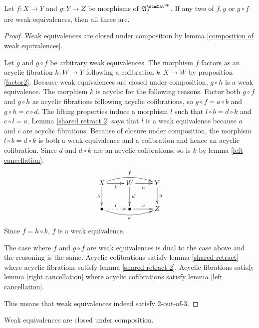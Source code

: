 \documentclass{tac}
\newcommand\dual{^{\mathrm{op}}}
\newcommand\s{^{\simCat\dual}}
\newcommand\of{:}
\newcommand\f{_f}
\newcommand\ambient{\mathfrak A}
\begin{document}
\begin{lemma}[2-out-of-3] Let $f\of X\to Y$ and $g\of Y\to Z$ be morphisms of $\ambient\s\f$. If any two of $f,g$ or $g\circ f$ are weak equivalences, then all three are. \label{toot}\end{lemma}

\begin{proof} Weak equivalences are closed under composition by lemma \ref{composition of weak equivalences}.

Let $g$ and $g\circ f$ be arbitrary weak equivalences. The morphism $f$ factors as an acyclic fibration $h\of W\to Y$ following a cofibration $k\of X\to W$ by proposition \ref{factor2}. Because weak equivalences are closed under composition, $g\circ h$ is a weak equivalence. The morphism $k$ is acyclic for the following reasons. Factor both $g\circ f$ and $g\circ h$ as acyclic fibrations following acyclic cofibrations, so $g\circ f = a\circ b$ and $g\circ h = c\circ d$. The lifting properties induce a morphism $l$ such that $l\circ b = d\circ k$ and $c\circ l = a$. Lemma \ref{shared retract 2} says that $l$ is a weak equivalence because $a$ and $c$ are acyclic fibrations. 
Because of closure under composition, the morphism $l\circ b = d\circ k$ is both a weak equivalence and a cofibration and hence an acyclic cofibration. Since $d$ and $d\circ k$ are an acyclic cofibrations, so is $k$ by lemma \ref{left cancellation}.
\[\xymatrix{
X\ar[r]_k\ar@/^2ex/[rr]^f\ar[d]_b & W\ar[r]_h\ar[d]^d & Y\ar[d]^g \\
\bullet\ar@/_2ex/[rr]_a\ar@{.>}[r]^l & \bullet\ar[r]^c & Z
}\]
Since $f = h\circ k$, $f$ is a weak equivalence.

The case where $f$ and $g\circ f$ are weak equivalences is dual to the case above and the reasoning is the same. Acyclic cofibrations satisfy lemma \ref{shared retract} where acyclic fibrations satisfy lemma \ref{shared retract 2}. Acyclic fibrations satisfy lemma \ref{right cancellation} where acyclic cofibrations satisfy lemma \ref{left cancellation}.

This means that weak equivalences indeed satisfy 2-out-of-3.
\end{proof}

\begin{lemma} Weak equivalences are closed under composition. \label{composition of weak equivalences}\end{lemma}
\end{document}
